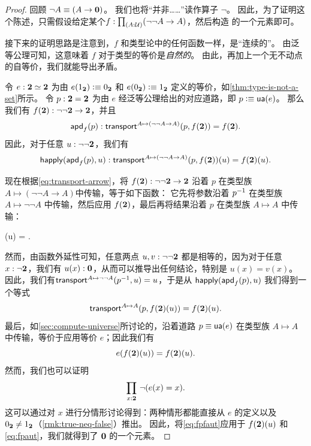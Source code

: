 \begin{proof}
  回顾 $\neg A \equiv (A\to\mathbf{0})$。
  我们也将``并非……''读作算子 $\neg$。
  因此，为了证明这个陈述，只需假设给定某个$f:\prd{A:\UU} (\neg\neg A \to A)$，然后构造 \emptyt 的一个元素即可。

  接下来的证明思路是注意到，$f$ 和类型论中的任何函数一样，是``连续的''。
  由泛等公理可知，这意味着 $f$ 对于类型的等价是\emph{自然的}。
  由此，再加上一个无不动点的自等价，我们就能导出矛盾。

  令 $e:\mathbf{2} \simeq \mathbf{2}$ 为由 $e({1_{\mathbf{2}}})\vcentcolon\equiv{0_{\ensuremath{\mathbf{2}}}}$ 和 $e({0_{\mathbf{2}}})\vcentcolon\equiv{1_{\ensuremath{\mathbf{2}}}}$ 定义的等价，如\cref{thm:type-is-not-a-set}所示。
  令 $p:\mathbf{2}=\mathbf{2}$ 为由 $e$ 经泛等公理给出的对应道路，即 $p\vcentcolon\equiv \mathsf{ua}(e)$。
  那么我们有 $f(\mathbf{2}) : \neg\neg\mathbf{2} \to\mathbf{2}$，并且
  \[\mathsf{apd}_{f}\mathopen{}\left(p\right)\mathclose{} : \mathsf{transport}^{A\mapsto (\neg\neg A \to A)}(p,f(\mathbf{2})) = f(\mathbf{2}).\]
  因此，对于任意 $u:\neg\neg\mathbf{2}$，我们有
  \[\mathsf{happly}(\mathsf{apd}_{f}\mathopen{}\left(p\right)\mathclose{},u) : \mathsf{transport}^{A\mapsto (\neg\neg A \to A)}(p,f(\mathbf{2}))(u) = f(\mathbf{2})(u).\]

  现在根据\eqref{eq:transport-arrow}，将 $f(\mathbf{2}):\neg\neg\mathbf{2}\to\mathbf{2}$ 沿着 $p$ 在类型族${A\mapsto (\neg\neg A \to A)}$中传输，等于如下函数：
  它先将参数沿着 $\mathord{{p}^{-1}}$ 在类型族 $A\mapsto \neg\neg A$ 中传输，然后应用 $f(\mathbf{2})$，最后再将结果沿着 $p$ 在类型族 $A\mapsto A$ 中传输：
  \begin{narrowmultline*}
    (u) =
    \narrowbreak
    .
  \end{narrowmultline*}
  然而，由函数外延性可知，任意两点 $u,v:\neg\neg\mathbf{2}$ 都是相等的，因为对于任意 $x:\neg\mathbf{2}$，我们有 $u(x):\mathbf{0}$，从而可以推导出任何结论，特别是 $u(x)=v(x)$。
  因此，我们有$\mathsf{transport}^{A\mapsto \neg\neg A}(\mathord{{p}^{-1}},u) = u$，于是从 $\mathsf{happly}(\mathsf{apd}_{f}\mathopen{}\left(p\right)\mathclose{},u)$ 我们得到一个等式
  \[ \mathsf{transport}^{A\mapsto A}(p,f(\mathbf{2})(u)) = f(\mathbf{2})(u).\]
  最后，如\cref{sec:compute-universe}所讨论的，沿着道路 $p\equiv \mathsf{ua}(e)$ 在类型族 $A\mapsto A$ 中传输，等价于应用等价 $e$；因此我们有
  \begin{equation}
    e(f(\mathbf{2})(u)) = f(\mathbf{2})(u).\label{eq:fpaut}
  \end{equation}
  然而，我们也可以证明
  \begin{equation}
    \prd{x:\bool} \neg(e(x)=x).\label{eq:fpfaut}
  \end{equation}
  这可以通过对 $x$ 进行分情形讨论得到：两种情形都能直接从 $e$ 的定义以及 ${0_{\mathbf{2}}}\neq{1_{\ensuremath{\mathbf{2}}}}$（\cref{rmk:true-neq-false}）推出。
  因此，将\eqref{eq:fpfaut}应用于 $f(\mathbf{2})(u)$ 和\eqref{eq:fpaut}，我们就得到了 $\mathbf{0}$ 的一个元素。
\end{proof}

